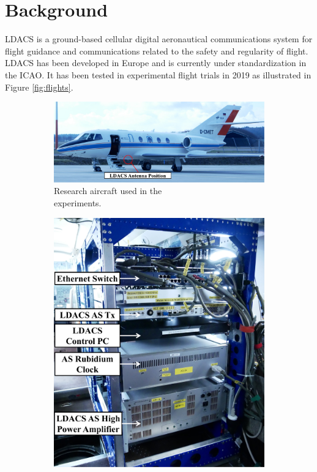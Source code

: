 \section{Background}
\label{Background}

\ac{LDACS} is a ground-based cellular digital aeronautical communications system for flight guidance and communications related to the safety and regularity of flight. LDACS has been developed in Europe and is currently under standardization in the \ac{ICAO}. It has been tested in experimental flight trials in 2019 as illustrated in Figure \ref{fig:flights}.

\begin{figure}
    \begin{subfigure}[b]{0.755\columnwidth}
            \includegraphics[width=0.99\linewidth]{img/Falcon-D20.pdf}
            \caption{Research aircraft used in the\\ experiments.}
            \label{fig:FalconD20E5}
    \end{subfigure}%
	\begin{subfigure}[b]{0.245\columnwidth}
        \includegraphics[width=0.99\linewidth]{img/AirborneStation.pdf}

\end{subfigure}
\end{figure}
